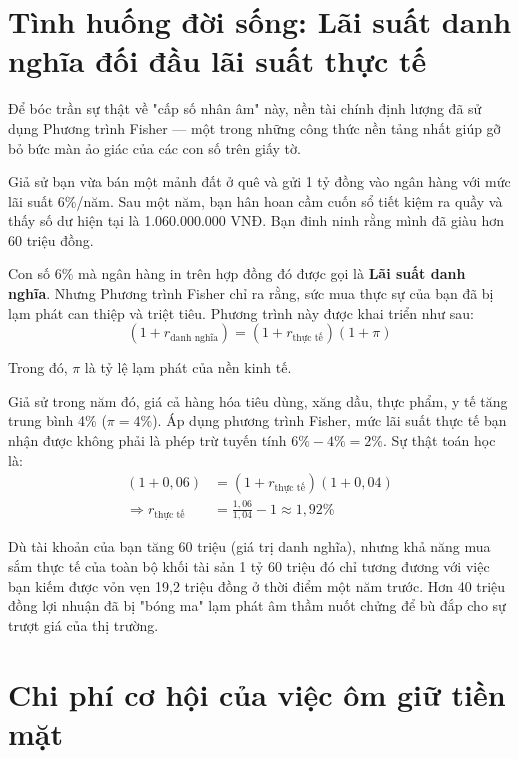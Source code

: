 \documentclass[14pt, a4paper, oneside]{extreport}
\begin{document}
\section{Tình huống đời sống: Lãi suất danh nghĩa đối đầu lãi suất thực tế}

Để bóc trần sự thật về "cấp số nhân âm" này, nền tài chính định lượng đã sử dụng Phương trình Fisher --- một trong những công thức nền tảng nhất giúp gỡ bỏ bức màn ảo giác của các con số trên giấy tờ.

\begin{tcolorbox}[colback=blue!5!white, colframe=blue!75!black, 
                  title=\textbf{Ảo giác của sổ tiết kiệm}, arc=2mm]
Giả sử bạn vừa bán một mảnh đất ở quê và gửi 1 tỷ đồng vào ngân hàng với mức lãi suất 6\%/năm. Sau một năm, bạn hân hoan cầm cuốn sổ tiết kiệm ra quầy và thấy số dư hiện tại là 1.060.000.000 VNĐ. Bạn đinh ninh rằng mình đã giàu hơn 60 triệu đồng. 
\end{tcolorbox}

Con số 6\% mà ngân hàng in trên hợp đồng đó được gọi là \textbf{Lãi suất danh nghĩa}. Nhưng Phương trình Fisher chỉ ra rằng, sức mua thực sự của bạn đã bị lạm phát can thiệp và triệt tiêu. Phương trình này được khai triển như sau:
\begin{equation}
    (1 + r_{\text{danh nghĩa}}) = (1 + r_{\text{thực tế}})(1 + \pi)
\end{equation}

Trong đó, $\pi$ là tỷ lệ lạm phát của nền kinh tế. 

Giả sử trong năm đó, giá cả hàng hóa tiêu dùng, xăng dầu, thực phẩm, y tế tăng trung bình 4\% ($\pi = 4\%$). Áp dụng phương trình Fisher, mức lãi suất thực tế bạn nhận được không phải là phép trừ tuyến tính $6\% - 4\% = 2\%$. Sự thật toán học là:
\begin{align*}
    (1 + 0,06) &= (1 + r_{\text{thực tế}})(1 + 0,04) \\
    \Rightarrow r_{\text{thực tế}} &= \frac{1,06}{1,04} - 1 \approx 1,92\%
\end{align*}

Dù tài khoản của bạn tăng 60 triệu (giá trị danh nghĩa), nhưng khả năng mua sắm thực tế của toàn bộ khối tài sản 1 tỷ 60 triệu đó chỉ tương đương với việc bạn kiếm được vỏn vẹn 19,2 triệu đồng ở thời điểm một năm trước. Hơn 40 triệu đồng lợi nhuận đã bị "bóng ma" lạm phát âm thầm nuốt chửng để bù đắp cho sự trượt giá của thị trường.

\section{Chi phí cơ hội của việc ôm giữ tiền mặt}
\end{document}
